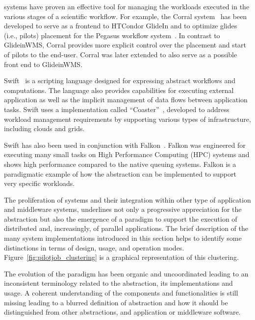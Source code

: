 \documentclass{sig-alternate}
\begin{document}



\pilotjob systems have proven an effective tool for managing the workloads
executed in the various stages of a scientific workflow. For example, the Corral
system~\cite{rynge2011experiences} has been developed to serve as a frontend to
HTCondor GlideIn and to optimize glides (i.e., pilots) placement for the Pegasus
workflow system~\cite{deelman2015}. In contrast to GlideinWMS, Corral provides
more explicit control over the placement and start of pilots to the end-user.
Corral was later extended to also serve as a possible front end to GlideinWMS.

Swift~\cite{wilde2011swift} is a scripting language designed for expressing
abstract workflows and computations. The language also provides capabilities for
executing external application as well as the implicit management of data flows
between application tasks. Swift uses a \pilot implementation called
``Coaster''~\cite{coasters_url}, developed to address workload management
requirements by supporting various types of infrastructure, including clouds and
grids.

Swift has also been used in conjunction with Falkon~\cite{raicu2007}. Falkon was
engineered for executing many small tasks on High Performance Computing (HPC)
systems and shows high performance compared to the native queuing systems.
Falkon is a paradigmatic example of how the \pilot abstraction can be
implemented to support very specific workloads.

The proliferation of \pilotjob systems and their integration within other type
of application and middleware systems, underlines not only a progressive
appreciation for the \pilot abstraction but also the emergence of a \pilot
paradigm to support the execution of distributed and, increasingly, of parallel
applications. The brief description of the many \pilotjob system implementations
introduced in this section helps to identify some distinctions in terms of
design, usage, and operation modes. Figure~\ref{fig:pilotjob_clustering} is a
graphical representation of this clustering.

The evolution of the \pilot paradigm has been organic and uncoordinated leading
to an inconsistent terminology related to the \pilot abstraction, its
implementations and usage. A coherent understanding of the \pilot components and
functionalities is still missing leading to a blurred definition of \pilot
abstraction and how it should be distinguished from other abstractions, and
application or middleware software.
\end{document}
